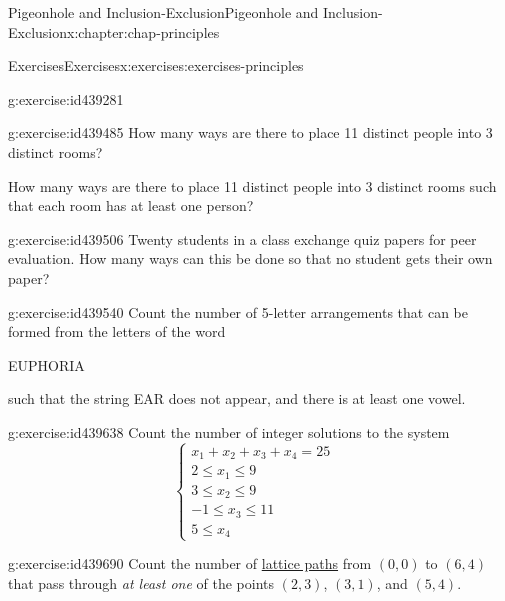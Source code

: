 \documentclass[oneside,10pt,]{book}
\numberwithin{equation}{section}
\newcommand{\amp}{&}
\begin{document}
\begin{chapterptx}{Pigeonhole and Inclusion-Exclusion}{}{Pigeonhole and Inclusion-Exclusion}{}{}{x:chapter:chap-principles}
\begin{exercises-section}{Exercises}{}{Exercises}{}{}{x:exercises:exercises-principles}
\begin{divisionexercise}{11}{}{}{g:exercise:id439281}
\begin{enumerate}[label=(\alph*)]
\end{enumerate}
%
\end{divisionexercise}%
\begin{divisionexercise}{12}{}{}{g:exercise:id439485}%
How many ways are there to place 11 distinct people into 3 distinct rooms?%
\par
How many ways are there to place 11 distinct people into 3 distinct rooms such that each room has at least one person?%
\end{divisionexercise}%
\begin{divisionexercise}{13}{}{}{g:exercise:id439506}%
Twenty students in a class exchange quiz papers for peer evaluation. How many ways can this be done so that no student gets their own paper?%
\end{divisionexercise}%
\begin{divisionexercise}{14}{}{}{g:exercise:id439540}%
Count the number of 5-letter arrangements that can be formed from the letters of the word%
\begin{sidebyside}{1}{0.375}{0.375}{0}%
\begin{sbspanel}{0.25}%
EUPHORIA%
\end{sbspanel}%
\end{sidebyside}%
\par
such that the string EAR does not appear, and there is at least one vowel.%
\end{divisionexercise}%
\begin{divisionexercise}{15}{}{}{g:exercise:id439638}%
Count the number of integer solutions to the system%
\begin{equation*}
\begin{cases} x_1 + x_2 + x_3 + x_4 = 25 \amp \\ 
2 \leq x_1 \leq 9 \amp \\
3 \leq x_2 \leq 9 \amp \\
-1 \leq x_3 \leq 11 \amp \\
5 \leq x_4 \ \ \amp \end{cases}
\end{equation*}
%
\end{divisionexercise}%
\begin{divisionexercise}{16}{}{}{g:exercise:id439690}%
Count the number of \hyperref[x:example:eg-counting-lattice-path]{lattice paths} from \((0,0)\) to \((6,4)\) that pass through \emph{at least one} of the points \((2,3)\), \((3,1)\), and \((5,4)\).%
\begin{sidebyside}{1}{0.3}{0.3}{0}%
\begin{sbspanel}{0.4}%

\end{sbspanel}
\end{sidebyside}
\end{divisionexercise}
\end{exercises-section}
\end{chapterptx}
\end{document}
